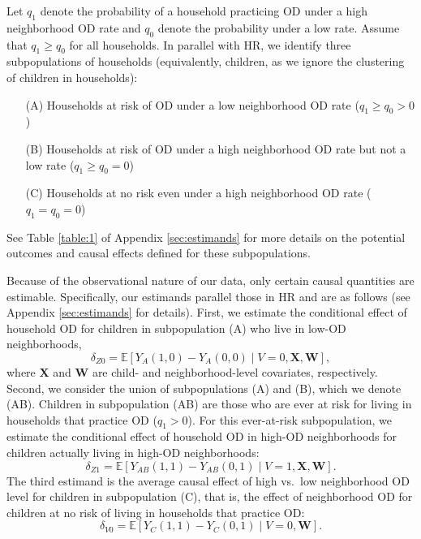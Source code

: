 \documentclass[12pt,a4paper,titlepage]{article}
\begin{document}
Let $q_1$ denote the probability of a household practicing OD under a high neighborhood OD rate and $q_0$ denote the probability under a low rate. Assume that $q_1 \geq q_0$ for all households. In parallel with HR, we identify three subpopulations of households (equivalently, children, as we ignore the clustering of children in households):
\begin{itemize}
	\item[(A)] Households at risk of OD under a low neighborhood OD rate ($q_1 \geq q_0 > 0$)
	\item[(B)] Households at risk of OD under a high neighborhood OD rate but not a low rate ($q_1 \geq q_0 = 0$)
	\item[(C)] Households at no risk even under a high neighborhood OD rate ($q_1 = q_0 = 0$)
\end{itemize}
See Table \ref{table:1} of Appendix \ref{sec:estimands} for more details on the potential outcomes and causal effects defined for these subpopulations.

Because of the observational nature of our data, only certain causal quantities are estimable. Specifically, our estimands parallel those in HR and are as follows (see Appendix \ref{sec:estimands} for details). First, we estimate the conditional effect of household OD for children in subpopulation (A) who live in low-OD neighborhoods,
\begin{equation}\label{eq:delta_z0}
	\delta_{Z0} = \mathbb{E}[Y_A(1,0) - Y_A(0,0) \mid V=0, \mathbf{X}, \mathbf{W}],
\end{equation}
where $\mathbf{X}$ and $\mathbf{W}$ are child- and neighborhood-level covariates, respectively. Second, we consider the union of subpopulations (A) and (B), which we denote (AB). Children in subpopulation (AB) are those who are ever at risk for living in households that practice OD ($q_1 > 0$). For this ever-at-risk subpopulation, we estimate the conditional effect of household OD in high-OD neighborhoods for children actually living in high-OD neighborhoods:
\begin{equation}\label{eq:delta_z1}
	\delta_{Z1} = \mathbb{E}[Y_{AB}(1,1) - Y_{AB}(0,1) \mid V=1, \mathbf{X}, \mathbf{W}].
\end{equation}
The third estimand is the average causal effect of high vs.\ low neighborhood OD level for children in subpopulation (C), that is, the effect of neighborhood OD for children at no risk of living in households that practice OD:
\begin{equation}\label{eq:delta_v0}
	\delta_{V0} = \mathbb{E}[Y_C(1,1) - Y_C(0,1) \mid V=0, \mathbf{W}].
\end{equation}
\end{document}
